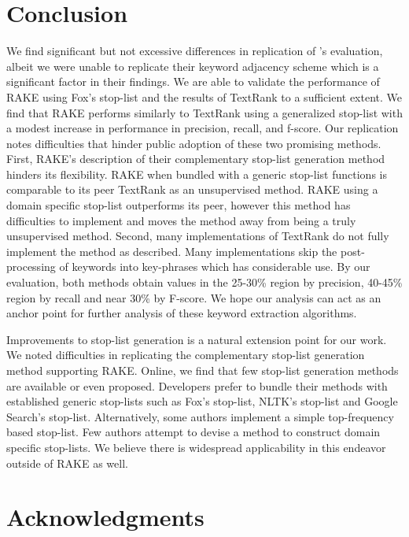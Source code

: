 \documentclass[11pt,a4paper]{article}
\begin{document}
\section{Conclusion}

We find significant but not excessive differences in replication of \citet{1}'s evaluation, albeit we were unable to replicate their keyword adjacency scheme which is a significant factor in their findings. We are able to validate the performance of RAKE using Fox's stop-list and the results of TextRank to a sufficient extent. We find that RAKE performs similarly to TextRank using a generalized stop-list with a modest increase in performance in precision, recall, and f-score. Our replication notes difficulties that hinder public adoption of these two promising methods. First, RAKE's description of their complementary stop-list generation method hinders its flexibility. RAKE when bundled with a generic stop-list functions is comparable to its peer TextRank as an unsupervised method. RAKE using a domain specific stop-list outperforms its peer, however this method has difficulties to implement and moves the method away from being a truly unsupervised method. Second, many implementations of TextRank do not fully implement the method as described. Many implementations skip the post-processing of keywords into key-phrases which has considerable use. By our evaluation, both methods obtain values in the 25-30\% region by precision, 40-45\% region by recall and near 30\% by F-score. We hope our analysis can act as an anchor point for further analysis of these keyword extraction algorithms. 

Improvements to stop-list generation is a natural extension point for our work. We noted difficulties in replicating the complementary stop-list generation method supporting RAKE. Online, we find that few stop-list generation methods are available or even proposed. Developers prefer to bundle their methods with established generic stop-lists such as Fox's stop-list, NLTK's stop-list and Google Search's stop-list. Alternatively, some authors implement a simple top-frequency based stop-list. Few authors attempt to devise a method to construct domain specific stop-lists. We believe there is widespread applicability in this endeavor outside of RAKE as well.


\newpage
\section{Acknowledgments}
\end{document}
